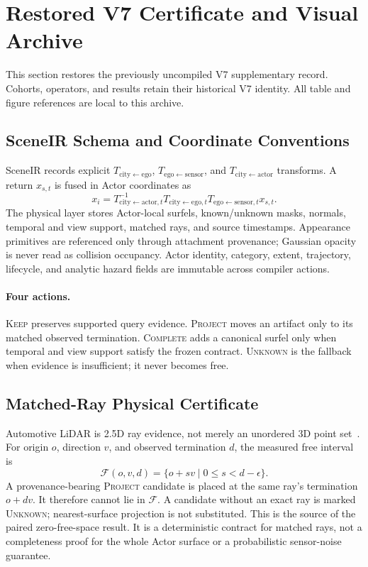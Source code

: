 \section{Restored V7 Certificate and Visual Archive}
\label{sec:restored-v7}

This section restores the previously uncompiled V7 supplementary record. Cohorts, operators, and results retain their historical V7 identity. All table and figure references are local to this archive.

\subsection{SceneIR Schema and Coordinate Conventions}

SceneIR records explicit $T_{\mathrm{city}\leftarrow\mathrm{ego}}$,
$T_{\mathrm{ego}\leftarrow\mathrm{sensor}}$, and
$T_{\mathrm{city}\leftarrow\mathrm{actor}}$ transforms. A return $x_{s,t}$ is fused in Actor coordinates as
\begin{equation}
x_i = T^{-1}_{\mathrm{city}\leftarrow\mathrm{actor},t}
      T_{\mathrm{city}\leftarrow\mathrm{ego},t}
      T_{\mathrm{ego}\leftarrow\mathrm{sensor},t} x_{s,t}.
\end{equation}
The physical layer stores Actor-local surfels, known/unknown masks, normals, temporal and view support, matched rays, and source
timestamps. Appearance primitives are referenced only through attachment provenance; Gaussian opacity is never read as collision
occupancy. Actor identity, category, extent, trajectory, lifecycle, and analytic hazard fields are immutable across compiler actions.

\paragraph{Four actions.}
\textsc{Keep} preserves supported query evidence. \textsc{Project} moves an artifact only to its matched observed termination.
\textsc{Complete} adds a canonical surfel only when temporal and view support satisfy the frozen contract. \textsc{Unknown} is the
fallback when evidence is insufficient; it never becomes free.

\subsection{Matched-Ray Physical Certificate}

Automotive LiDAR is 2.5D ray evidence, not merely an unordered 3D point set~\cite{hu2020visibility}. For origin $o$, direction
$v$, and observed termination $d$, the measured free interval is
\begin{equation}
\mathcal F(o,v,d)=\{o+sv\mid 0\leq s<d-\epsilon\}.
\end{equation}
A provenance-bearing \textsc{Project} candidate is placed at the same ray's termination $o+dv$. It therefore cannot lie in
$\mathcal F$. A candidate without an exact ray is marked \textsc{Unknown}; nearest-surface projection is not substituted. This is
the source of the paired zero-free-space result. It is a deterministic contract for matched rays, not a completeness proof for the
whole Actor surface or a probabilistic sensor-noise guarantee.

